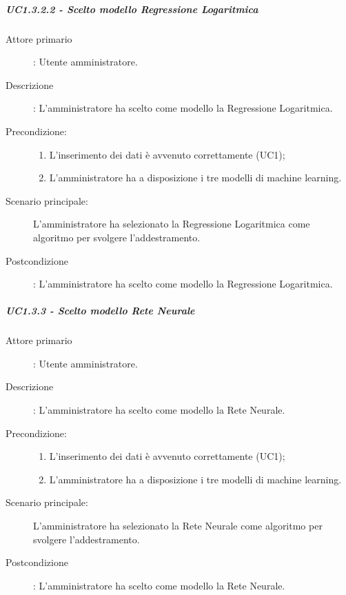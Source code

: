 \subparagraph*{UC1.3.2.2 - Scelto modello Regressione Logaritmica}
\label{sssec:uc1.3.2.2}
\begin{description}
  \item[Attore primario]: Utente amministratore.
  \item[Descrizione]: L'amministratore ha scelto come modello la Regressione Logaritmica.
  \item[Precondizione:]
  \begin{enumerate}
    \item L'inserimento dei dati è avvenuto correttamente (UC1);
    \item L'amministratore ha a disposizione i tre modelli di machine learning.
  \end{enumerate}
  \item[Scenario principale:] L'amministratore ha selezionato la Regressione Logaritmica come algoritmo per svolgere l'addestramento.
  \item[Postcondizione]: L'amministratore ha scelto come modello la Regressione Logaritmica.
\end{description}

\subparagraph{UC1.3.3 - Scelto modello Rete Neurale}
\label{sssec:uc1.3.3}
\begin{description}
  \item[Attore primario]: Utente amministratore.
  \item[Descrizione]: L'amministratore ha scelto come modello la Rete Neurale.
  \item[Precondizione:]
  \begin{enumerate}
    \item L'inserimento dei dati è avvenuto correttamente (UC1);
    \item L'amministratore ha a disposizione i tre modelli di machine learning.
  \end{enumerate}
  \item[Scenario principale:] L'amministratore ha selezionato la Rete Neurale come algoritmo per svolgere l'addestramento.
  \item[Postcondizione]: L'amministratore ha scelto come modello la Rete Neurale.
\end{description}



